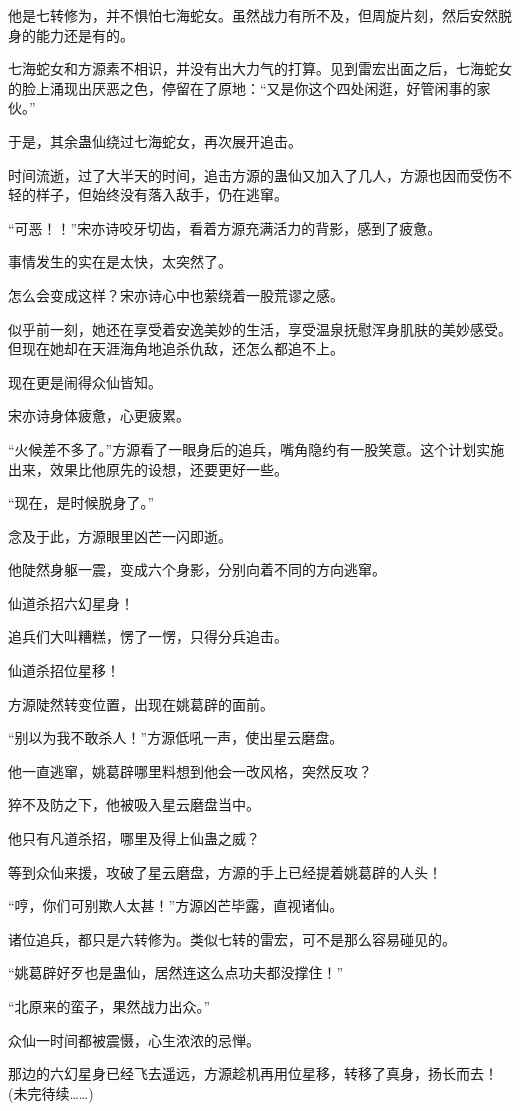 \begin{this_body}
他是七转修为，并不惧怕七海蛇女。虽然战力有所不及，但周旋片刻，然后安然脱身的能力还是有的。

七海蛇女和方源素不相识，并没有出大力气的打算。见到雷宏出面之后，七海蛇女的脸上涌现出厌恶之色，停留在了原地：“又是你这个四处闲逛，好管闲事的家伙。”

于是，其余蛊仙绕过七海蛇女，再次展开追击。

时间流逝，过了大半天的时间，追击方源的蛊仙又加入了几人，方源也因而受伤不轻的样子，但始终没有落入敌手，仍在逃窜。

“可恶！！”宋亦诗咬牙切齿，看着方源充满活力的背影，感到了疲惫。

事情发生的实在是太快，太突然了。

怎么会变成这样？宋亦诗心中也萦绕着一股荒谬之感。

似乎前一刻，她还在享受着安逸美妙的生活，享受温泉抚慰浑身肌肤的美妙感受。但现在她却在天涯海角地追杀仇敌，还怎么都追不上。

现在更是闹得众仙皆知。

宋亦诗身体疲惫，心更疲累。

“火候差不多了。”方源看了一眼身后的追兵，嘴角隐约有一股笑意。这个计划实施出来，效果比他原先的设想，还要更好一些。

“现在，是时候脱身了。”

念及于此，方源眼里凶芒一闪即逝。

他陡然身躯一震，变成六个身影，分别向着不同的方向逃窜。

仙道杀招六幻星身！

追兵们大叫糟糕，愣了一愣，只得分兵追击。

仙道杀招位星移！

方源陡然转变位置，出现在姚葛辟的面前。

“别以为我不敢杀人！”方源低吼一声，使出星云磨盘。

他一直逃窜，姚葛辟哪里料想到他会一改风格，突然反攻？

猝不及防之下，他被吸入星云磨盘当中。

他只有凡道杀招，哪里及得上仙蛊之威？

等到众仙来援，攻破了星云磨盘，方源的手上已经提着姚葛辟的人头！

“哼，你们可别欺人太甚！”方源凶芒毕露，直视诸仙。

诸位追兵，都只是六转修为。类似七转的雷宏，可不是那么容易碰见的。

“姚葛辟好歹也是蛊仙，居然连这么点功夫都没撑住！”

“北原来的蛮子，果然战力出众。”

众仙一时间都被震慑，心生浓浓的忌惮。

那边的六幻星身已经飞去遥远，方源趁机再用位星移，转移了真身，扬长而去！(未完待续……)

\end{this_body}

